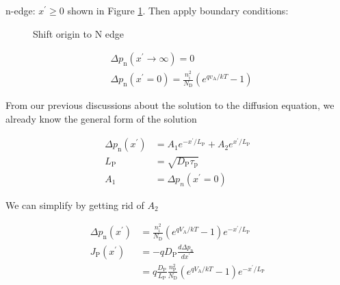 \documentclass[main.tex]{subfiles}
\begin{document}
\begin{enumerate}
\begin{enumerate}
        n-edge: $x^{\prime} \geq 0$ shown in Figure \ref{fig:18ad_a}. Then apply boundary conditions: 

        \begin{figure}
        \centering{}
        \caption{Shift origin to N edge}
        \label{fig:18ad_a}
        \end{figure}

        $$
        \begin{aligned}
        & \Delta p_{\mathrm{n}}\left(x^{\prime} \rightarrow \infty\right)=0 \\
        & \Delta p_{\mathrm{n}}\left(x^{\prime}=0\right)=\frac{n_{\mathrm{i}}^2}{N_{\mathrm{D}}}\left(e^{q v_{\mathrm{A}} / k T}-1\right)
        \end{aligned}
        $$

        From our previous discussions about the solution to the diffusion equation, we already know the general form of the solution

        $$
        \begin{aligned}
        \Delta p_{\mathrm{n}}\left(x^{\prime}\right) &= A_1 e^{-x^{\prime} / L_{\mathrm{P}}}+A_2 e^{x^{\prime} / L_{\mathrm{P}}} \\
        L_{\mathrm{P}} &= \sqrt{D_{\mathrm{P}} \tau_{\mathrm{p}}} \\
        A_1 &= \Delta p_n\left(x^{\prime}=0\right)
        \end{aligned}
        $$

        We can simplify by getting rid of $A_2$

        $$
        \begin{aligned}
        \Delta p_{\mathrm{n}}\left(x^{\prime}\right) &= \frac{n_{\mathrm{i}}^2}{N_{\mathrm{D}}}\left(e^{q V_{\mathrm{A}} / k T}-1\right) e^{-x^{\prime} / L_{\mathrm{P}}} \\
        J_{\mathrm{P}}\left(x^{\prime}\right) &= -q D_{\mathrm{P}} \frac{d \Delta p_{\mathrm{n}}}{d x^{\prime}}\\
        &= q \frac{D_{\mathrm{P}}}{L_{\mathrm{P}}} \frac{n_{\mathrm{P}}^2}{N_{\mathrm{D}}}\left(e^{q V_{\mathrm{A}} / k T}-1\right) e^{-x^{\prime} / L_{\mathrm{P}}}
        \end{aligned}
        $$


\end{enumerate}
\end{enumerate}
\end{document}
